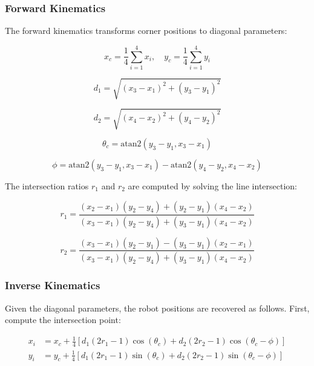 \documentclass[lettersize,journal]{IEEEtran}
\begin{document}
\subsubsection{Forward Kinematics}
\vspace{-0.2em}

The forward kinematics transforms corner positions to diagonal parameters:

\begin{equation}
x_c = \frac{1}{4}\sum_{i=1}^{4} x_i, \quad y_c = \frac{1}{4}\sum_{i=1}^{4} y_i
\end{equation}

\begin{equation}
d_1 = \sqrt{(x_3 - x_1)^2 + (y_3 - y_1)^2}
\end{equation}

\begin{equation}
d_2 = \sqrt{(x_4 - x_2)^2 + (y_4 - y_2)^2}
\end{equation}

\begin{equation}
\theta_c = \text{atan2}(y_3 - y_1, x_3 - x_1)
\end{equation}

\begin{equation}
\phi = \text{atan2}(y_3 - y_1, x_3 - x_1) - \text{atan2}(y_4 - y_2, x_4 - x_2)
\end{equation}

The intersection ratios $r_1$ and $r_2$ are computed by solving the line intersection:

\begin{equation}
r_1 = \frac{(x_2 - x_1)(y_2 - y_4) + (y_2 - y_1)(x_4 - x_2)}{(x_3 - x_1)(y_2 - y_4) + (y_3 - y_1)(x_4 - x_2)}
\end{equation}

\begin{equation}
r_2 = \frac{(x_3 - x_1)(y_2 - y_1) - (y_3 - y_1)(x_2 - x_1)}{(x_3 - x_1)(y_2 - y_4) + (y_3 - y_1)(x_4 - x_2)}
\end{equation}

\subsubsection{Inverse Kinematics}

Given the diagonal parameters, the robot positions are recovered as follows. First, compute the intersection point:

\begin{equation}
\begin{aligned}
x_i &= x_c + \frac{1}{4}\left[d_1(2r_1 - 1)\cos(\theta_c) + d_2(2r_2 - 1)\cos(\theta_c - \phi)\right] \\
y_i &= y_c + \frac{1}{4}\left[d_1(2r_1 - 1)\sin(\theta_c) + d_2(2r_2 - 1)\sin(\theta_c - \phi)\right]
\end{aligned}
\end{equation}
\end{document}
